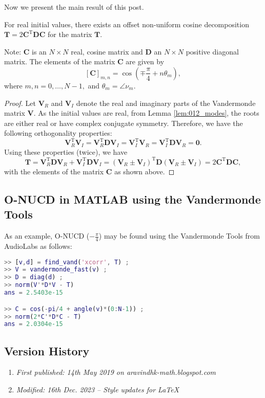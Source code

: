 Now we present the main result of this post.

\begin{theorem}[O-NUCD]
For real initial values, there exists an offset non-uniform cosine decomposition $\boldsymbol{T} = 2 \boldsymbol{C}^\text{T} \boldsymbol{D} \boldsymbol{C}$ for the matrix $\boldsymbol{T}.$
\end{theorem}

Note: $\boldsymbol{C}$ is an $N\times N$ real, cosine matrix and $\boldsymbol{D}$ an $N\times N$ positive diagonal matrix. The elements of the matrix $\boldsymbol{C}$ are given by \[
[\boldsymbol{C}]_{m,n} = \cos\left(\mp \frac{\pi}{4} + n \theta_m\right),\] where $m,n = 0,\dots,N-1,$  and $\theta_m = \angle \nu_m.$

\begin{proof}
Let $\boldsymbol{V}_R$ and $\boldsymbol{V}_I$ denote the real and imaginary parts of the Vandermonde matrix $\boldsymbol{V}.$ As the initial values are real, from Lemma \ref{lem:012_modes}, the roots are either real or have complex conjugate symmetry. Therefore, we have the following orthogonality properties: \[\boldsymbol{V}_R^\text{T} \boldsymbol{V}_I = \boldsymbol{V}_R^\text{T} \boldsymbol{D} \boldsymbol{V}_I = \boldsymbol{V}_I^\text{T} \boldsymbol{V}_R = \boldsymbol{V}_I^\text{T} \boldsymbol{D} \boldsymbol{V}_R =\boldsymbol{0}.\] Using these properties (twice), we have \[\boldsymbol{T} =  \boldsymbol{V}_R^\text{T} \boldsymbol{D} \boldsymbol{V}_R +  \boldsymbol{V}_I^\text{T} \boldsymbol{D} \boldsymbol{V}_I = (\boldsymbol{V}_R \pm \boldsymbol{V}_I)^\text{T} \boldsymbol{D} (\boldsymbol{V}_R \pm \boldsymbol{V}_I) = 2 \boldsymbol{C}^\text{T} \boldsymbol{D} \boldsymbol{C},\] with the elements of the matrix $\boldsymbol{C}$ as shown above.
\end{proof}

\subsection{O-NUCD in MATLAB using the Vandermonde Tools}
As an example, O-NUCD ($-\frac{\pi}{4}$) may be found using the Vandermonde Tools from AudioLabs \cite{Backstrom2015} as follows:

\begin{lstlisting}[language=MATLAB,numbers=none]
>> [v,d] = find_vand('xcorr', T) ;
>> V = vandermonde_fast(v) ;
>> D = diag(d) ;
>> norm(V'*D*V - T)
ans = 2.5403e-15

>> C = cos(-pi/4 + angle(v)*(0:N-1)) ;
>> norm(2*C'*D*C - T)
ans = 2.0304e-15
\end{lstlisting}

\subsection{Version History}
\begin{enumerate}
	\item \emph{First published: 14th May 2019 on aravindhk-math.blogspot.com}
	\item \emph{Modified: 16th Dec. 2023 -- Style updates for \LaTeX}
\end{enumerate}


